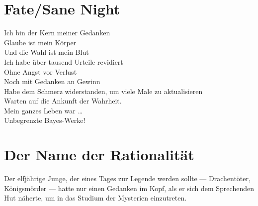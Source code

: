 \section{Fate/Sane Night}
%
\begin{emph}
Ich bin der Kern meiner Gedanken\\
Glaube ist mein Körper\\
Und die Wahl ist mein Blut\\
Ich habe über tausend Urteile revidiert\\
Ohne Angst vor Verlust\\
Noch mit Gedanken an Gewinn\\
Habe dem Schmerz widerstanden, um viele Male zu aktualisieren\\
Warten auf die Ankunft der Wahrheit.\\
Mein ganzes Leben war … \\
Unbegrenzte Bayes-Werke!\\
\end{emph}

\section{Der Name der Rationalität}

Der elfjährige Junge, der eines Tages zur Legende werden sollte — Drachentöter, Königsmörder — hatte nur einen Gedanken im Kopf, als er sich dem Sprechenden Hut näherte, um in das Studium der Mysterien einzutreten.


